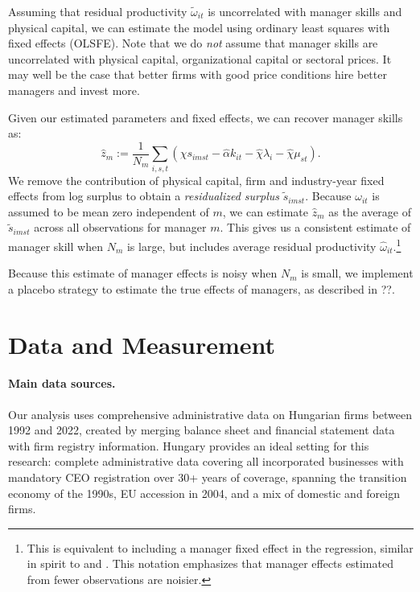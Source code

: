 \documentclass[11pt,a4paper]{article}
\begin{document}
Assuming that residual productivity $\tilde\omega_{it}$ is uncorrelated with manager skills and physical capital, we can estimate the model using ordinary least squares with fixed effects (OLSFE). Note that we do \emph{not} assume that manager skills are uncorrelated with physical capital, organizational capital or sectoral prices. It may well be the case that better firms with good price conditions hire better managers and invest more. 

Given our estimated parameters and fixed effects, we can recover manager skills as:
\begin{equation}\label{eq:estimated}
\hat z_m :=
\frac1{N_m}\sum_{i,s,t}(
        \hat\chi s_{imst} -  \hat\alpha k_{it}  -\hat\chi \lambda_i -\hat\chi \mu_{st}
). 
\end{equation}
We remove the contribution of physical capital, firm and industry-year fixed effects from log surplus to obtain a \emph{residualized surplus} $\tilde s_{imst}$. Because $\omega_{it}$ is assumed to be mean zero independent of $m$, we can estimate $\hat z_m$ as the average of $\tilde s_{imst}$ across all observations for manager $m$. This gives us a consistent estimate of manager skill when $N_m$ is large, but includes average residual productivity $\hat\omega_{it}$.\footnote{This is equivalent to including a manager fixed effect in the regression, similar in spirit to \citet{Abowd1999Econometrica} and \citet{Card2018JoLE}. This notation emphasizes that manager effects estimated from fewer observations are noisier.}

Because this estimate of manager effects is noisy when $N_m$ is small, we implement a placebo strategy to estimate the true effects of managers, as described in ??.

\section{Data and Measurement}
\paragraph{Main data sources.} Our analysis uses comprehensive administrative data on Hungarian firms between 1992 and 2022, created by merging balance sheet and financial statement data with firm registry information. Hungary provides an ideal setting for this research: complete administrative data covering all incorporated businesses with mandatory CEO registration over 30+ years of coverage, spanning the transition economy of the 1990s, EU accession in 2004, and a mix of domestic and foreign firms. %
\end{document}
